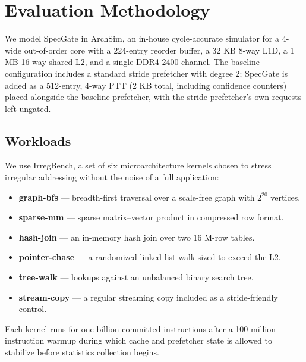 \section{Evaluation Methodology}
We model SpecGate in ArchSim, an in-house cycle-accurate simulator for a 4-wide out-of-order core with a 224-entry reorder buffer, a 32 KB 8-way L1D, a 1 MB 16-way shared L2, and a single DDR4-2400 channel. The baseline configuration includes a standard stride prefetcher with degree 2; SpecGate is added as a 512-entry, 4-way PTT (2 KB total, including confidence counters) placed alongside the baseline prefetcher, with the stride prefetcher's own requests left ungated.

\subsection{Workloads}
We use IrregBench, a set of six microarchitecture kernels chosen to stress irregular addressing without the noise of a full application:
\begin{itemize}
  \item \textbf{graph-bfs} --- breadth-first traversal over a scale-free graph with $2^{20}$ vertices.
  \item \textbf{sparse-mm} --- sparse matrix--vector product in compressed row format.
  \item \textbf{hash-join} --- an in-memory hash join over two 16 M-row tables.
  \item \textbf{pointer-chase} --- a randomized linked-list walk sized to exceed the L2.
  \item \textbf{tree-walk} --- lookups against an unbalanced binary search tree.
  \item \textbf{stream-copy} --- a regular streaming copy included as a stride-friendly control.
\end{itemize}
Each kernel runs for one billion committed instructions after a 100-million-instruction warmup during which cache and prefetcher state is allowed to stabilize before statistics collection begins.
